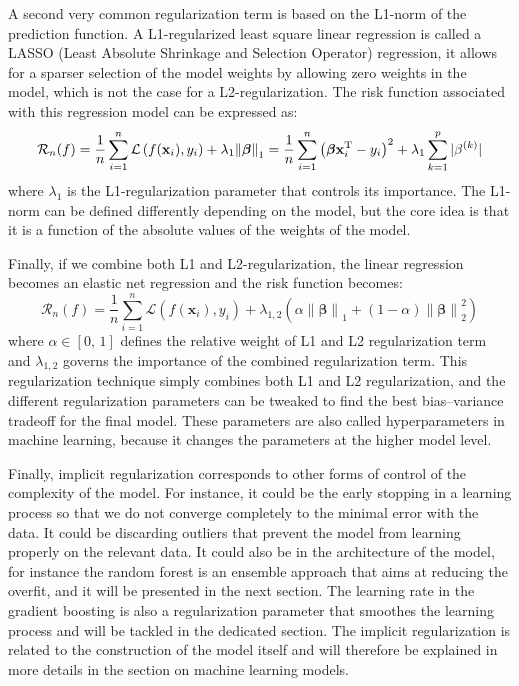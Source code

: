 \documentclass[main]{subfiles}
\begin{document}
A second very common regularization term is based on the L1-norm of the prediction function. A L1-regularized least square linear regression is called a LASSO (Least Absolute Shrinkage and Selection Operator) regression, it allows for a sparser selection of the model weights by allowing zero weights in the model, which is not the case for a L2-regularization. The risk function associated with this regression model can be expressed as:
\begin{equation}\label{eq:L1_reg}
  \mathcal{R}_n(f) = \frac{1}{n}\sum_{i=1}^n \mathcal{L}\left(f(\mathbf{x}_i),y_i\right) + \lambda_1{\lVert \boldsymbol{\beta} \rVert}_1 = \frac{1}{n}\sum_{i=1}^n {\left(\boldsymbol{\beta}\mathbf{x}_i^{\text{T}}-y_i\right)}^2 + \lambda_1 \sum_{k=1}^p |\beta^{(k)}|
\end{equation}
where $\lambda_1$ is the L1-regularization parameter that controls its importance. The L1-norm can be defined differently depending on the model, but the core idea is that it is a function of the absolute values of the weights of the model. 

Finally, if we combine both L1 and L2-regularization, the linear regression becomes an elastic net regression and the risk function becomes:
\begin{equation}\label{eq:elasticnet_reg}
  \mathcal{R}_n(f) = \frac{1}{n}\sum_{i=1}^n \mathcal{L}\left(f(\mathbf{x}_i),y_i\right) + \lambda_{1,2} \left({\alpha \lVert \boldsymbol{\beta} \rVert }_1 + (1-\alpha) {\lVert \boldsymbol{\beta} \rVert}_2^2\right)
\end{equation}
where $\alpha\in[0,\,1]$ defines the relative weight of L1 and L2 regularization term and $\lambda_{1,2}$ governs the importance of the combined regularization term. This regularization technique simply combines both L1 and L2 regularization, and the different regularization parameters can be tweaked to find the best bias--variance tradeoff for the final model. These parameters are also called hyperparameters in machine learning, because it changes the parameters at the higher model level.

Finally, implicit regularization corresponds to other forms of control of the complexity of the model. For instance, it could be the early stopping in a learning process so that we do not converge completely to the minimal error with the data. It could be discarding outliers that prevent the model from learning properly on the relevant data. It could also be in the architecture of the model, for instance the random forest is an ensemble approach that aims at reducing the overfit, and it will be presented in the next section. The learning rate in the gradient boosting is also a regularization parameter that smoothes the learning process and will be tackled in the dedicated section. The implicit regularization is related to the construction of the model itself and will therefore be explained in more details in the section on machine learning models.
\end{document}
